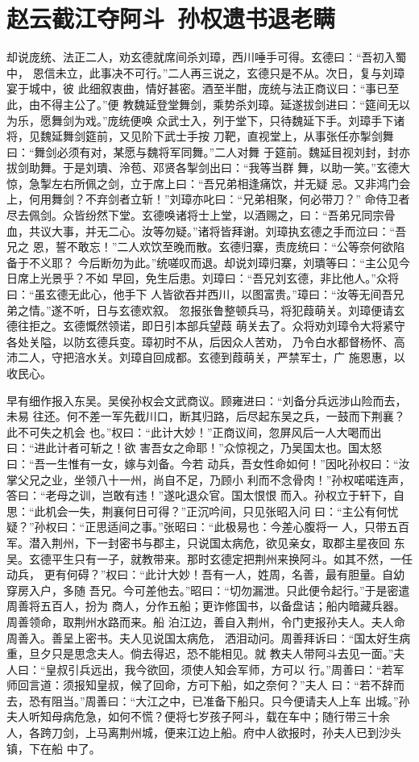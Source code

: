 \chapter{赵云截江夺阿斗~孙权遗书退老瞒}

却说庞统、法正二人，劝玄德就席间杀刘璋，西川唾手可得。玄德曰：“吾初入蜀中，
恩信未立，此事决不可行。”二人再三说之，玄德只是不从。次日，复与刘璋宴于城中，彼
此细叙衷曲，情好甚密。酒至半酣，庞统与法正商议曰：“事已至此，由不得主公了。”便
教魏延登堂舞剑，乘势杀刘璋。延遂拔剑进曰：“筵间无以为乐，愿舞剑为戏。”庞统便唤
众武士入，列于堂下，只待魏延下手。刘璋手下诸将，见魏延舞剑筵前，又见阶下武士手按
刀靶，直视堂上，从事张任亦掣剑舞曰：“舞剑必须有对，某愿与魏将军同舞。”二人对舞
于筵前。魏延目视刘封，封亦拔剑助舞。于是刘璝、泠苞、邓贤各掣剑出曰：“我等当群
舞，以助一笑。”玄德大惊，急掣左右所佩之剑，立于席上曰：“吾兄弟相逢痛饮，并无疑
忌。又非鸿门会上，何用舞剑？不弃剑者立斩！”刘璋亦叱曰：“兄弟相聚，何必带刀？”
命侍卫者尽去佩剑。众皆纷然下堂。玄德唤诸将士上堂，以酒赐之，曰：“吾弟兄同宗骨
血，共议大事，并无二心。汝等勿疑。”诸将皆拜谢。刘璋执玄德之手而泣曰：“吾兄之
恩，誓不敢忘！”二人欢饮至晚而散。玄德归寨，责庞统曰：“公等奈何欲陷备于不义耶？
今后断勿为此。”统嗟叹而退。却说刘璋归寨，刘璝等曰：“主公见今日席上光景乎？不如
早回，免生后患。刘璋曰：“吾兄刘玄德，非比他人。”众将曰：“虽玄德无此心，他手下
人皆欲吞并西川，以图富贵。”璋曰：“汝等无间吾兄弟之情。”遂不听，日与玄德欢叙。
忽报张鲁整顿兵马，将犯葭萌关。刘璋便请玄德往拒之。玄德慨然领诺，即日引本部兵望葭
萌关去了。众将劝刘璋令大将紧守各处关隘，以防玄德兵变。璋初时不从，后因众人苦劝，
乃令白水都督杨怀、高沛二人，守把涪水关。刘璋自回成都。玄德到葭萌关，严禁军士，广
施恩惠，以收民心。

早有细作报入东吴。吴侯孙权会文武商议。顾雍进曰：“刘备分兵远涉山险而去，未易
往还。何不差一军先截川口，断其归路，后尽起东吴之兵，一鼓而下荆襄？此不可失之机会
也。”权曰：“此计大妙！”正商议间，忽屏风后一人大喝而出曰：“进此计者可斩之！欲
害吾女之命耶！”众惊视之，乃吴国太也。国太怒曰：“吾一生惟有一女，嫁与刘备。今若
动兵，吾女性命如何！”因叱孙权曰：“汝掌父兄之业，坐领八十一州，尚自不足，乃顾小
利而不念骨肉！”孙权喏喏连声，答曰：“老母之训，岂敢有违！”遂叱退众官。国太恨恨
而入。孙权立于轩下，自思：“此机会一失，荆襄何日可得？”正沉吟间，只见张昭入问
曰：“主公有何忧疑？”孙权曰：“正思适间之事。”张昭曰：“此极易也：今差心腹将一
人，只带五百军。潜入荆州，下一封密书与郡主，只说国太病危，欲见亲女，取郡主星夜回
东吴。玄德平生只有一子，就教带来。那时玄德定把荆州来换阿斗。如其不然，一任动兵，
更有何碍？”权曰：“此计大妙！吾有一人，姓周，名善，最有胆量。自幼穿房入户，多随
吾兄。今可差他去。”昭曰：“切勿漏泄。只此便令起行。”于是密遣周善将五百人，扮为
商人，分作五船；更诈修国书，以备盘诘；船内暗藏兵器。周善领命，取荆州水路而来。船
泊江边，善自入荆州，令门吏报孙夫人。夫人命周善入。善呈上密书。夫人见说国太病危，
洒泪动问。周善拜诉曰：“国太好生病重，旦夕只是思念夫人。倘去得迟，恐不能相见。就
教夫人带阿斗去见一面。”夫人曰：“皇叔引兵远出，我今欲回，须使人知会军师，方可以
行。”周善曰：“若军师回言道：须报知皇叔，候了回命，方可下船，如之奈何？”夫人
曰：“若不辞而去，恐有阻当。”周善曰：“大江之中，已准备下船只。只今便请夫人上车
出城。”孙夫人听知母病危急，如何不慌？便将七岁孩子阿斗，载在车中；随行带三十余
人，各跨刀剑，上马离荆州城，便来江边上船。府中人欲报时，孙夫人已到沙头镇，下在船
中了。

